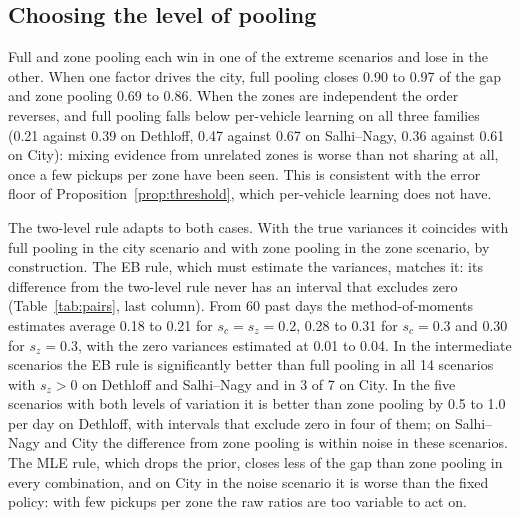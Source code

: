 \documentclass[preprint,authoryear,12pt]{elsarticle}
\begin{document}
\begin{table}[t]
\centering\footnotesize
\caption{Mean daily cost of the fixed and known policies and share of
the gap between them closed by each learning rule. Bold marks the
largest share in a row. Shares can exceed one or fall below zero
because the known rule is not optimal.}\label{tab:gap}
\resizebox{\textwidth}{!}{}
\end{table}

\begin{table}[t]
\centering\footnotesize
\caption{Paired differences in mean daily cost between the EB rule and
other rules, with 95\% instance-clustered bootstrap intervals. Negative
values favour EB; bold marks intervals that exclude zero.}\label{tab:pairs}
\resizebox{\textwidth}{!}{}
\end{table}

\subsection{Choosing the level of pooling}

Full and zone pooling each win in one of the extreme scenarios and lose
in the other. When one factor drives the city, full pooling closes
0.90 to 0.97 of the gap and zone pooling 0.69 to 0.86. When the zones
are independent the order reverses, and full pooling falls below
per-vehicle learning on all three families (0.21 against 0.39 on
Dethloff, 0.47 against 0.67 on Salhi--Nagy, 0.36 against 0.61 on City):
mixing evidence from unrelated zones is worse than not sharing at all,
once a few pickups per zone
have been seen. This is consistent with the error floor of
Proposition~\ref{prop:threshold}, which per-vehicle learning does not
have.

The two-level rule adapts to both cases. With the true
variances it coincides with full pooling in the city scenario and with
zone pooling in the zone scenario, by construction. The EB rule, which
must estimate the variances, matches it: its difference from the
two-level rule never has an interval that excludes zero
(Table~\ref{tab:pairs}, last column). From 60 past days the
method-of-moments estimates average 0.18 to 0.21 for $s_c = s_z = 0.2$,
0.28 to 0.31 for $s_c = 0.3$ and 0.30 for $s_z = 0.3$, with the zero
variances estimated at 0.01 to 0.04. In the intermediate scenarios the
EB rule is significantly better than full pooling in all 14 scenarios
with $s_z > 0$ on Dethloff and Salhi--Nagy and in 3 of 7 on City. In
the five scenarios with both levels of variation it is better than zone
pooling by 0.5 to 1.0 per day on Dethloff, with intervals that exclude
zero in four of them; on Salhi--Nagy and City the difference from zone
pooling is within noise in these scenarios. The MLE rule, which drops
the prior, closes less of the gap than zone pooling in every
combination, and on City in the noise scenario it is worse than the
fixed policy: with few pickups per zone the raw ratios are too variable
to act on.
\end{document}
